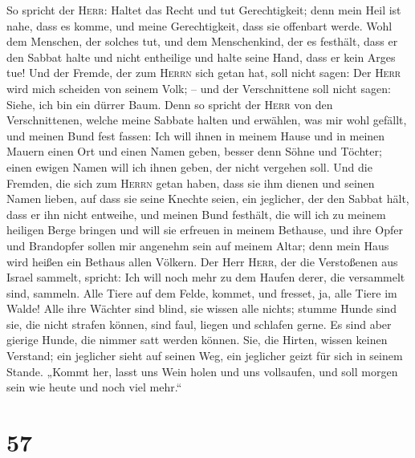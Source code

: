  So spricht der \textsc{Herr}: Haltet das Recht und tut
Gerechtigkeit; denn mein Heil ist nahe, dass es komme, und meine
Gerechtigkeit, dass sie offenbart werde.  Wohl dem
Menschen, der solches tut, und dem Menschenkind, der es festhält, dass
er den Sabbat halte und nicht entheilige und halte seine Hand, dass er
kein Arges tue!  Und der Fremde, der zum \textsc{Herrn}
sich getan hat, soll nicht sagen: Der \textsc{Herr} wird mich scheiden
von seinem Volk; -- und der Verschnittene soll nicht sagen: Siehe, ich
bin ein dürrer Baum.  Denn so spricht der \textsc{Herr}
von den Verschnittenen, welche meine Sabbate halten und erwählen, was
mir wohl gefällt, und meinen Bund fest fassen:  Ich will
ihnen in meinem Hause und in meinen Mauern einen Ort und einen Namen
geben, besser denn Söhne und Töchter; einen ewigen Namen will ich ihnen
geben, der nicht vergehen soll.  Und die Fremden, die sich
zum \textsc{Herrn} getan haben, dass sie ihm dienen und seinen Namen
lieben, auf dass sie seine Knechte seien, ein jeglicher, der den Sabbat
hält, dass er ihn nicht entweihe, und meinen Bund festhält,
 die will ich zu meinem heiligen Berge bringen und will
sie erfreuen in meinem Bethause, und ihre Opfer und Brandopfer sollen
mir angenehm sein auf meinem Altar; denn mein Haus wird heißen ein
Bethaus allen Völkern.  Der Herr \textsc{Herr}, der die
Verstoßenen aus Israel sammelt, spricht: Ich will noch mehr zu dem
Haufen derer, die versammelt sind, sammeln.  Alle Tiere
auf dem Felde, kommet, und fresset, ja, alle Tiere im Walde!
 Alle ihre Wächter sind blind, sie wissen alle nichts;
stumme Hunde sind sie, die nicht strafen können, sind faul, liegen und
schlafen gerne.  Es sind aber gierige Hunde, die nimmer
satt werden können. Sie, die Hirten, wissen keinen Verstand; ein
jeglicher sieht auf seinen Weg, ein jeglicher geizt für sich in seinem
Stande.  „Kommt her, lasst uns Wein holen und uns
vollsaufen, und soll morgen sein wie heute und noch viel mehr.``

\hypertarget{section-56}{%
\section{57}\label{section-56}}

